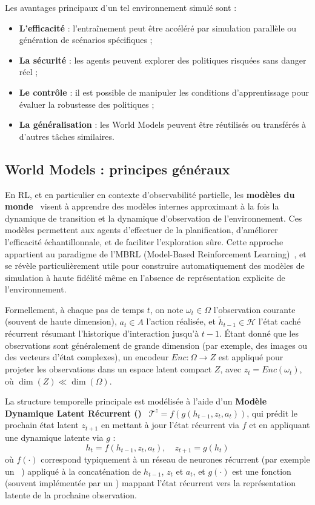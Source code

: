 Les avantages principaux d'un tel environnement simulé sont :
\begin{itemize}
    \item \textbf{L'efficacité} : l'entraînement peut être accéléré par simulation parallèle ou génération de scénarios spécifiques ;
    \item \textbf{La sécurité} : les agents peuvent explorer des politiques risquées sans danger réel ;
    \item \textbf{Le contrôle} : il est possible de manipuler les conditions d'apprentissage pour évaluer la robustesse des politiques ;
    \item \textbf{La généralisation} : les World Models peuvent être réutilisés ou transférés à d'autres tâches similaires.
\end{itemize}

\subsection{World Models : principes généraux}

En \ac{RL}, et en particulier en contexte d'observabilité partielle, les \textbf{modèles du monde}~\cite{ha2018recurrent, hafner2020dream} visent à apprendre des modèles internes approximant à la fois la dynamique de transition et la dynamique d'observation de l'environnement. Ces modèles permettent aux agents d'effectuer de la planification, d'améliorer l'efficacité échantillonnale, et de faciliter l'exploration sûre. Cette approche appartient au paradigme de l'\ac{MBRL} (Model-Based Reinforcement Learning)~\cite{moerland2020model}, et se révèle particulièrement utile pour construire automatiquement des modèles de simulation à haute fidélité même en l'absence de représentation explicite de l'environnement.

Formellement, à chaque pas de temps $t$, on note $\omega_t \in \Omega$ l'observation courante (souvent de haute dimension), $a_t \in A$ l'action réalisée, et $\tilde{h}_{t-1} \in \mathcal{H}$ l'état caché récurrent résumant l'historique d'interaction jusqu'à $t-1$. Étant donné que les observations sont généralement de grande dimension (par exemple, des images ou des vecteurs d'état complexes), un encodeur $Enc: \Omega \rightarrow Z$ est appliqué pour projeter les observations dans un espace latent compact $Z$, avec $z_t = Enc(\omega_t)$, où $\dim(Z) \ll \dim(\Omega)$.

La structure temporelle principale est modélisée à l'aide d'un \textbf{Modèle Dynamique Latent Récurrent ()}~\cite{hafner2020dream} $\mathcal{T}^{z} = f(g(h_{t-1}, z_t, a_t))$, qui prédit le prochain état latent $z_{t+1}$ en mettant à jour l'état récurrent via $f$ et en appliquant une dynamique latente via $g$ :
\[
h_t = f(h_{t-1}, z_t, a_t), \quad z_{t+1} = g(h_t)
\]
où $f(\cdot)$ correspond typiquement à un réseau de neurones récurrent (par exemple un ~\cite{hochreiter1997long}) appliqué à la concaténation de $h_{t-1}$, $z_t$ et $a_t$, et $g(\cdot)$ est une fonction (souvent implémentée par un ) mappant l'état récurrent vers la représentation latente de la prochaine observation.

